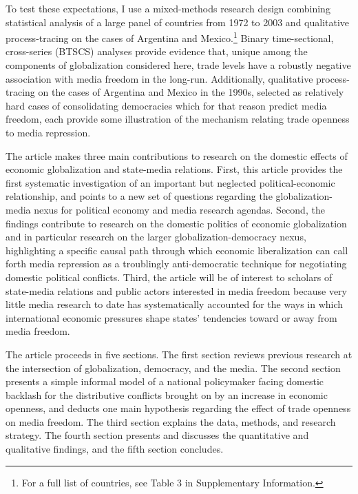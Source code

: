 \documentclass[12pt,a4paper]{article}\usepackage[]{graphicx}\usepackage[]{color}
\begin{document}
To test these expectations, I use a mixed-methods research design combining statistical analysis of a large panel of countries from 1972 to 2003 and qualitative process-tracing on the cases of Argentina and Mexico.\footnote{For a full list of countries, see Table 3 in Supplementary Information.} Binary time-sectional, cross-series (BTSCS) analyses provide evidence that, unique among the components of globalization considered here, trade levels have a robustly negative association with media freedom in the long-run. Additionally, qualitative process-tracing on the cases of Argentina and Mexico in the 1990s, selected as relatively hard cases of consolidating democracies which for that reason predict media freedom, each provide some illustration of the mechanism relating trade openness to media repression.

The article makes three main contributions to research on the domestic effects of economic globalization and state-media relations. First, this article provides the first systematic investigation of an important but neglected political-economic relationship, and points to a new set of questions regarding the globalization-media nexus for political economy and media research agendas. Second, the findings contribute to research on the domestic politics of economic globalization and in particular research on the larger globalization-democracy nexus, highlighting a specific causal path through which economic liberalization can call forth media repression as a troublingly anti-democratic technique for negotiating domestic political conflicts. Third, the article will be of interest to scholars of state-media relations and public actors interested in media freedom because very little media research to date has systematically accounted for the ways in which international economic pressures shape states' tendencies toward or away from media freedom.

The article proceeds in five sections. The first section reviews previous research at the intersection of globalization, democracy, and the media. The second section presents a simple informal model of a national policymaker facing domestic backlash for the distributive conflicts brought on by an increase in economic openness, and deducts one main hypothesis regarding the effect of trade openness on media freedom. The third section explains the data, methods, and research strategy. The fourth section presents and discusses the quantitative and qualitative findings, and the fifth section concludes.
\end{document}
